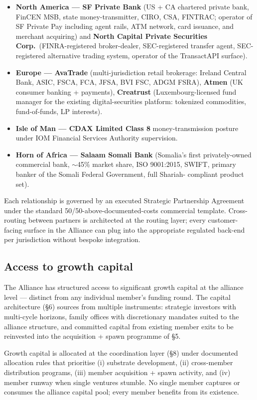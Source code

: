 \begin{itemize}[leftmargin=2em,itemsep=0.1em]
\item \textbf{North America --- SF Private Bank} (US + CA chartered
private bank, FinCEN MSB, state money-transmitter, CIRO, CSA, FINTRAC;
operator of SF Private Pay including agent rails, ATM network, card
issuance, and merchant acquiring) and \textbf{North Capital Private
Securities Corp.}\ (FINRA-registered broker-dealer, SEC-registered
transfer agent, SEC-registered alternative trading system, operator of
the TransactAPI surface).
\item \textbf{Europe --- AvaTrade} (multi-jurisdiction retail brokerage:
Ireland Central Bank, ASIC, FSCA, FCA, JFSA, BVI FSC, ADGM FSRA),
\textbf{Atmen} (UK consumer banking + payments), \textbf{Creatrust}
(Luxembourg-licensed fund manager for the existing digital-securities
platform: tokenized commodities, fund-of-funds, LP interests).
\item \textbf{Isle of Man --- CDAX Limited Class 8} money-transmission
posture under IOM Financial Services Authority supervision.
\item \textbf{Horn of Africa --- Salaam Somali Bank} (Somalia's first
privately-owned commercial bank, $\sim$45\% market share, ISO 9001:2015,
SWIFT, primary banker of the Somali Federal Government, full Shariah-
compliant product set).
\end{itemize}

Each relationship is governed by an executed Strategic Partnership
Agreement under the standard 50/50-above-documented-costs commercial
template. Cross-routing between partners is architected at the routing
layer; every customer-facing surface in the Alliance can plug into the
appropriate regulated back-end per jurisdiction without bespoke
integration.

\subsection{Access to growth capital}

The Alliance has structured access to significant growth capital
at the alliance level --- distinct from any individual member's funding
round. The capital architecture (\S 6) sources from multiple instruments:
strategic investors with multi-cycle horizons, family offices with
discretionary mandates suited to the alliance structure, and committed
capital from existing member exits to be reinvested into the
acquisition + spawn programme of \S 5.

Growth capital is allocated at the coordination layer (\S 8) under
documented allocation rules that prioritise (i) substrate development,
(ii) cross-member distribution programs, (iii) member acquisition + spawn
activity, and (iv) member runway when single ventures stumble. No
single member captures or consumes the alliance capital pool; every
member benefits from its existence.
